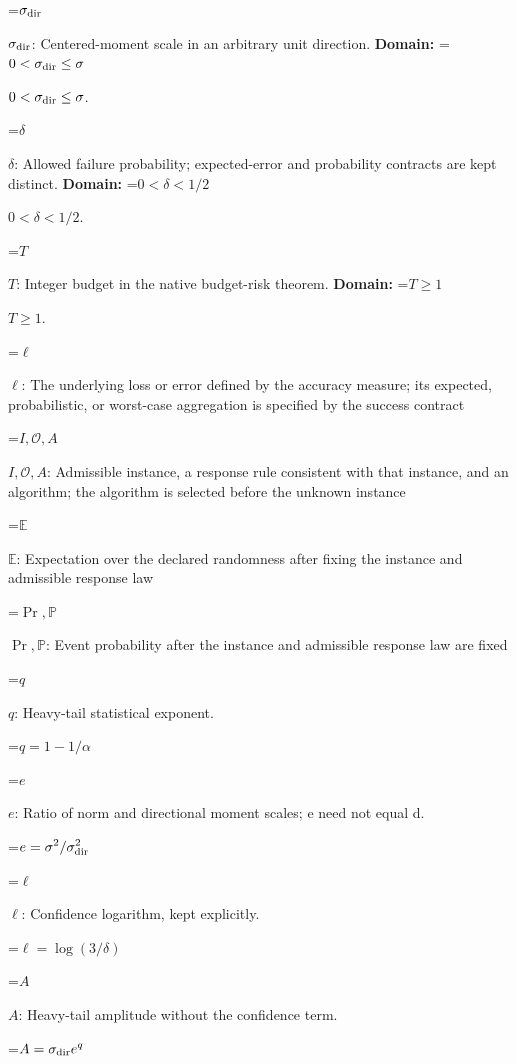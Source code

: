 \documentclass[10pt,a4paper]{article}
\newcommand{\AtlasMath}[1]{\par\begingroup\centering\setbox0=\hbox{$\displaystyle #1$}\ifdim\wd0>1.4\linewidth\typeout{ATLAS WIDE FORMULA: \the\wd0}\fi\ifdim\wd0>\linewidth\resizebox{\linewidth}{!}{\box0}\else\box0\fi\par\endgroup}
\newcommand{\AtlasInlineMath}[1]{\begingroup\setbox0=\hbox{$#1$}\ifdim\wd0>.4\linewidth\endgroup\AtlasMath{#1}\else\endgroup$#1$\fi}
\begin{document}
\AtlasInlineMath{\sigma_{\rm dir}}: Centered-moment scale in an arbitrary unit direction. \textbf{Domain:} \AtlasInlineMath{0<\sigma_{\rm dir}\le\sigma}.



\AtlasInlineMath{\delta}: Allowed failure probability; expected-error and probability contracts are kept distinct. \textbf{Domain:} \AtlasInlineMath{0<\delta<1/2}.



\AtlasInlineMath{T}: Integer budget in the native budget-risk theorem. \textbf{Domain:} \AtlasInlineMath{T\ge1}.



\AtlasInlineMath{\ell}: The underlying loss or error defined by the accuracy measure; its expected, probabilistic, or worst-case aggregation is specified by the success contract



\AtlasInlineMath{I,\mathcal{O},A}: Admissible instance, a response rule consistent with that instance, and an algorithm; the algorithm is selected before the unknown instance



\AtlasInlineMath{\mathbb{E}}: Expectation over the declared randomness after fixing the instance and admissible response law



\AtlasInlineMath{\Pr,\mathbb{P}}: Event probability after the instance and admissible response law are fixed



\AtlasInlineMath{q}: Heavy-tail statistical exponent.




\AtlasMath{q=1-1/\alpha}




\AtlasInlineMath{e}: Ratio of norm and directional moment scales; e need not equal d.




\AtlasMath{e=\sigma^2/\sigma_{\rm dir}^2}




\AtlasInlineMath{\ell}: Confidence logarithm, kept explicitly.




\AtlasMath{\ell=\log(3/\delta)}




\AtlasInlineMath{A}: Heavy-tail amplitude without the confidence term.




\AtlasMath{A=\sigma_{\rm dir}e^q}
\end{document}

